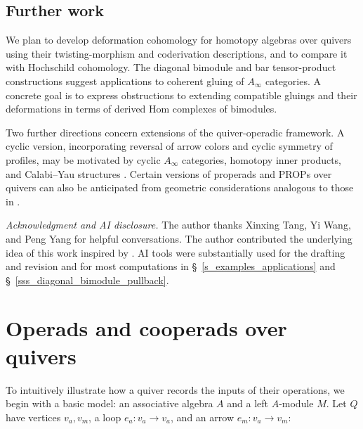 \documentclass[11pt,letterpaper]{article}
\numberwithin{equation}{section}
\theoremstyle{plain}
\theoremstyle{definition}
\theoremstyle{remark}
\begin{document}
\subsection*{Further work}

We plan to develop deformation cohomology for homotopy algebras over
quivers using their twisting-morphism and coderivation descriptions,
and to compare it with Hochschild cohomology. The diagonal bimodule
and bar tensor-product constructions suggest applications to coherent
gluing of $A_\infty$ categories. A concrete goal is to express
obstructions to extending compatible gluings and their deformations
in terms of derived Hom complexes of bimodules.

Two further directions concern extensions of the quiver-operadic framework.
A cyclic version, incorporating reversal of arrow colors and cyclic
symmetry of profiles, may be motivated by cyclic $A_\infty$ categories,
homotopy inner products, and Calabi--Yau structures
\cite{TradlerInfinityInnerProducts,Brav_Dyckerhoff_relative_CY}.
Certain versions of properads and PROPs over quivers can also be
anticipated from geometric considerations analogous to those in
\cite{Yuan_higher_operad_Fuk}.

\medskip
\noindent\textit{Acknowledgment and AI disclosure.}
The author thanks Xinxing Tang, Yi Wang, and Peng Yang for helpful conversations.
The author contributed the underlying idea of this work inspired by \cite{Yuan_higher_operad_Fuk}. 
AI tools were substantially used for the drafting and revision and for most computations in \S~\ref{s_examples_applications} and \S~\ref{sss_diagonal_bimodule_pullback}.

\section{Operads and cooperads over quivers}
\label{s_operads_over}

To intuitively illustrate how a quiver records the inputs of their operations, we begin with a basic model: an associative algebra $A$ and a left $A$-module $M$.
Let $Q$ have vertices $v_a,v_m$, a loop $e_a:v_a\to v_a$, and an arrow
$e_m:v_a\to v_m$:
\end{document}
